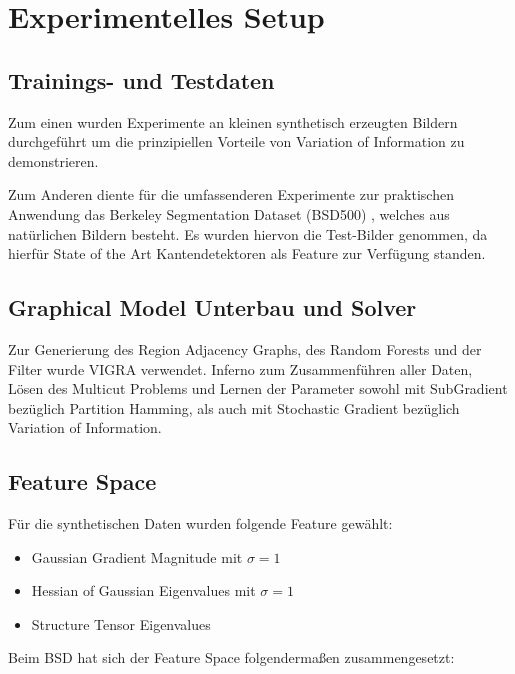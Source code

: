 \chapter{Experimentelles Setup}\label{ch:mathtest} %

\section{Trainings- und Testdaten}

Zum einen wurden Experimente an kleinen synthetisch erzeugten Bildern durchgeführt um die prinzipiellen Vorteile von Variation of Information zu demonstrieren. 

Zum Anderen diente für die umfassenderen Experimente zur praktischen Anwendung das Berkeley Segmentation Dataset (BSD500) \cite{BSD}, welches aus natürlichen Bildern besteht. Es wurden hiervon die Test-Bilder genommen, da hierfür State of the Art Kantendetektoren als Feature zur Verfügung standen.


\section{Graphical Model Unterbau und Solver}


Zur Generierung des Region Adjacency Graphs, des Random Forests und der Filter wurde VIGRA \cite{VIGRA} verwendet. Inferno \cite{Inferno} zum Zusammenführen aller Daten, Lösen des Multicut Problems und Lernen der Parameter sowohl mit SubGradient bezüglich Partition Hamming, als auch mit Stochastic Gradient bezüglich Variation of Information.



\section{Feature Space}

Für die synthetischen Daten wurden folgende Feature gewählt:
\begin{itemize}
	\item Gaussian Gradient Magnitude mit $\sigma=1$
	\item Hessian of Gaussian Eigenvalues mit $\sigma=1$
	\item Structure Tensor Eigenvalues
\end{itemize}

Beim BSD hat sich der Feature Space folgendermaßen zusammengesetzt:

